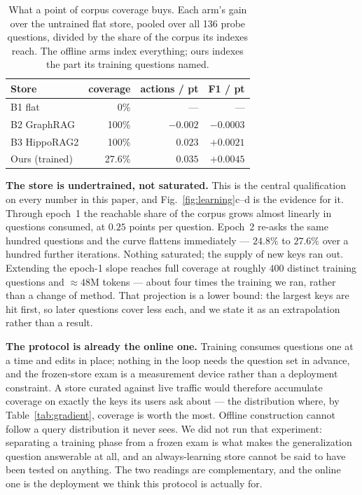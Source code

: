 \documentclass[conference]{IEEEtran}
\begin{document}
\begin{table}[!t]
\caption{What a point of corpus coverage buys. Each arm's gain over the
untrained flat store, pooled over all 136 probe questions, divided by the
share of the corpus its indexes reach. The offline arms index everything;
ours indexes the part its training questions named.}
\label{tab:percoverage}
\centering
\scriptsize
\renewcommand{\arraystretch}{1.2}
\setlength{\tabcolsep}{5pt}
\begin{tabular*}{\columnwidth}{@{\extracolsep{\fill}}lrrr@{}}
\toprule
Store & coverage & actions / pt & F1 / pt \\
\midrule
B1 flat & 0\% & --- & --- \\
B2 GraphRAG & 100\% & $-0.002$ & $-0.0003$ \\
B3 HippoRAG2 & 100\% & $0.023$ & $+0.0021$ \\
Ours (trained) & 27.6\% & $\mathbf{0.035}$ & $\mathbf{+0.0045}$ \\
\bottomrule
\end{tabular*}
\end{table}

\textbf{The store is undertrained, not saturated.} This is the central
qualification on every number in this paper, and Fig.~\ref{fig:learning}c--d
is the evidence for it. Through epoch~1 the
reachable share of the corpus grows almost linearly in questions consumed,
at $0.25$ points per question. Epoch~2 re-asks the same hundred questions
and the curve flattens immediately --- $24.8\%$ to $27.6\%$ over a hundred
further iterations. Nothing saturated; the supply of new keys ran out.
Extending the epoch-1 slope reaches full coverage at roughly $400$ distinct
training questions and $\approx 48$M tokens --- about four times the
training we ran, rather than a change of method. That projection is a lower
bound: the largest keys are hit first, so later questions cover less each,
and we state it as an extrapolation rather than a result.

\textbf{The protocol is already the online one.} Training consumes questions
one at a time and edits in place; nothing in the loop needs the question set
in advance, and the frozen-store exam is a measurement device rather than a
deployment constraint. A store curated against live traffic would therefore
accumulate coverage on exactly the keys its users ask about --- the
distribution where, by Table~\ref{tab:gradient}, coverage is worth the most.
Offline construction cannot follow a query distribution it never sees. We
did not run that experiment: separating a training phase from a frozen exam
is what makes the generalization question answerable at all, and an
always-learning store cannot be said to have been tested on anything. The
two readings are complementary, and the online one is the deployment we
think this protocol is actually for.
\end{document}
